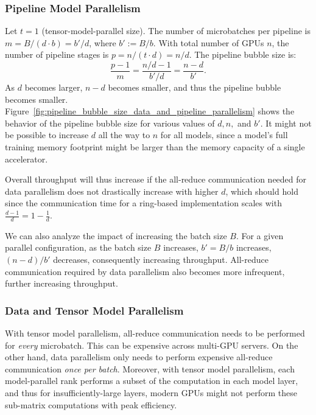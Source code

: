 \documentclass[sigconf,nonacm]{acmart}
\begin{document}
\subsubsection{Pipeline Model Parallelism} Let $t=1$ (tensor-model-parallel size). The number of microbatches per pipeline is $m = B / (d \cdot b)=b'/d$, where $b':=B/b$. With total number of GPUs $n$, the number of pipeline stages is $p=n/(t\cdot d)=n/d$. The pipeline bubble size is:$$\frac{p-1}{m} = \dfrac{n/d-1}{b'/d} = \dfrac{n-d}{b'}.$$
As $d$ becomes larger, $n-d$ becomes smaller, and thus the pipeline bubble becomes smaller. Figure~\ref{fig:pipeline_bubble_size_data_and_pipeline_parallelism} shows the behavior of the pipeline bubble size for various values of $d, n,$ and $b'$. It might not be possible to increase $d$ all the way to $n$ for all models, since a model's full training memory footprint might be larger than the memory capacity of a single accelerator.

Overall throughput will thus increase if the all-reduce communication needed for data parallelism does not drastically increase with higher $d$, which should hold since the communication time for a ring-based implementation scales with $\frac{d-1}{d} = 1 - \frac{1}{d}$.

We can also analyze the impact of increasing the batch size $B$. For a given parallel configuration, as the batch size $B$ increases, $b'=B/b$ increases, $(n-d)/b'$ decreases, consequently increasing throughput. All-reduce communication required by data parallelism also becomes more infrequent, further increasing throughput.

\subsubsection{Data and Tensor Model Parallelism}
With tensor model parallelism, all-reduce communication needs to be performed for \emph{every} microbatch. This can be expensive across multi-GPU servers. On the other hand, data parallelism only needs to perform expensive all-reduce communication \emph{once per batch}. Moreover, with tensor model parallelism, each model-parallel rank performs a subset of the computation in each model layer, and thus for insufficiently-large layers, modern GPUs might not perform these sub-matrix computations with peak efficiency.

\vspace{0.1in}

\noindent{}
\end{document}
